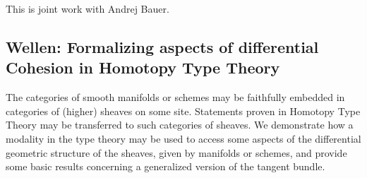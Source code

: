 \documentclass[a4paper,10pt]{scrartcl}
\begin{document}
This is joint work with Andrej Bauer.

\subsection*{Wellen: Formalizing aspects of differential Cohesion in Homotopy Type Theory}

The categories of smooth manifolds or schemes may be faithfully embedded in categories of (higher) sheaves on some site. Statements proven in Homotopy Type Theory may be transferred to such categories of sheaves.
We demonstrate how a modality in the type theory may be used to access some aspects of the differential geometric structure of the sheaves, given by manifolds or schemes, and provide some basic results concerning a generalized version of the tangent bundle.
\end{document}
